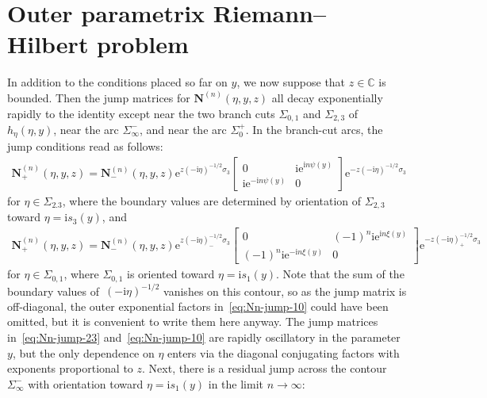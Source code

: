 \documentclass[11pt]{article}
\numberwithin{equation}{section}
\numberwithin{equation}{section}
\begin{document}
\section{Outer parametrix Riemann--Hilbert problem}

In addition to the conditions placed so far on $y$, we now suppose that $z\in\mathbb{C}$ is bounded. Then the jump matrices for $\mathbf{N}^{(n)}(\eta,y,z)$ all decay exponentially rapidly to the identity except near the two branch cuts $\Sigma_{0,1}$ and $\Sigma_{2,3}$ of $h_\eta(\eta,y)$, near the arc $\Sigma_{\infty}^-$, and near the arc $\Sigma_0^+$. In the branch-cut arcs, the jump conditions read as follows:
\begin{gather}
\mathbf{N}^{(n)}_+(\eta,y,z)=\mathbf{N}^{(n)}_-(\eta,y,z)\mathrm{e}^{z(-\mathrm{i}\eta)^{-1/2}\sigma_3}\!\!\begin{bmatrix}0 & \mathrm{i}\mathrm{e}^{\mathrm{i} n\psi(y)}\\\mathrm{i}\mathrm{e}^{-\mathrm{i} n\psi(y)} & 0\end{bmatrix}\!\mathrm{e}^{-z(-\mathrm{i}\eta)^{-1/2}\sigma_3}
\!\label{eq:Nn-jump-23}
\end{gather}
for $\eta\in\Sigma_{2.3}$, where the boundary values are determined by orientation of $\Sigma_{2,3}$ toward $\eta=\mathrm{i} s_3(y)$, and
\begin{gather}
 \mathbf{N}^{(n)}_+(\eta,y,z)=\mathbf{N}^{(n)}_-(\eta,y,z)\mathrm{e}^{z(-\mathrm{i}\eta)^{-1/2}_-\sigma_3}\begin{bmatrix}0 & (-1)^n\mathrm{i}\mathrm{e}^{\mathrm{i} n\xi(y)}\\
(-1)^n\mathrm{i}\mathrm{e}^{-\mathrm{i} n\xi(y)} & 0\end{bmatrix}\mathrm{e}^{-z(-\mathrm{i}\eta)^{-1/2}_+\sigma_3} \!\!\!
\label{eq:Nn-jump-10}
\end{gather}
for $\eta\in\Sigma_{0,1}$, where $\Sigma_{0,1}$ is oriented toward $\eta=\mathrm{i} s_1(y)$.
Note that the sum of the boundary values of~$(-\mathrm{i}\eta)^{-1/2}$ vanishes on this contour, so as the jump matrix is off-diagonal, the outer exponential factors in~\eqref{eq:Nn-jump-10} could have been omitted, but it is convenient to write them here anyway. The jump matrices in~\eqref{eq:Nn-jump-23} and~\eqref{eq:Nn-jump-10} are rapidly oscillatory in the parameter $y$, but the only dependence on $\eta$ enters via the diagonal conjugating factors with exponents proportional to $z$. Next, there is a residual jump across the contour $\Sigma_\infty^-$ with orientation toward $\eta=\mathrm{i} s_1(y)$ in the limit $n\to\infty$:
\end{document}
